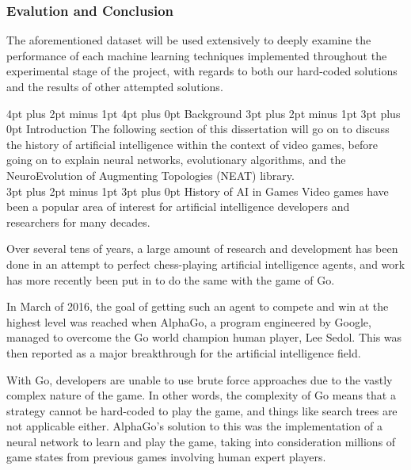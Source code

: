 \documentclass[12pt,a4paper]{article}
\makeatletter
\renewcommand\subsection{\@startsection {subsection}{1}{2mm} %
                               {3pt plus 2pt minus 1pt} %
                               {3pt plus 0pt} %
                               {\normalfont\bfseries}}
\renewcommand\section{\@startsection {section}{1}{0mm} %
                               {4pt plus 2pt minus 1pt} %
                               {4pt plus 0pt} %
                               {\bfseries}}
\makeatother
\begin{document}
\subsubsection{Evalution and Conclusion}
The aforementioned dataset will be used extensively to deeply examine the performance of each machine learning techniques implemented throughout the experimental stage of the project, with regards to both our hard-coded solutions and the results of other attempted solutions. 

\newpage
\section{Background}
\subsection{Introduction}
The following section of this dissertation will go on to discuss the history of artificial intelligence within the context of video games, before going on to explain neural networks, evolutionary algorithms, and the NeuroEvolution of Augmenting Topologies (NEAT) library.\\

\subsection{History of AI in Games}
Video games have been a popular area of interest for artificial intelligence developers and researchers for many decades. 

Over several tens of years, a large amount of research and development has been done in an attempt to perfect chess-playing artificial intelligence agents\citep{L2PChess}, and work has more recently been put in to do the same with the game of Go.  

In March of 2016, the goal of getting such an agent to compete and win at the highest level was reached when AlphaGo, a program engineered by Google, managed to overcome the Go world champion human player, Lee Sedol\citep{ABriefHistoryOfGameAI}. This was then reported as a major breakthrough for the artificial intelligence field. 

With Go, developers are unable to use brute force approaches due to the vastly complex nature of the game\citep{13}. In other words, the complexity of Go means that a strategy cannot be hard-coded to play the game, and things like search trees are not applicable either. AlphaGo's solution to this was the implementation of a neural network to learn and play the game, taking into consideration millions of game states from previous games involving human expert players. 
\end{document}
